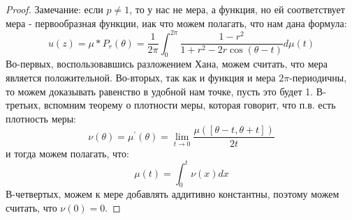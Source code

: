 \documentclass[12pt,a4paper]{article} %
\begin{document}
	\begin{proof}
		Замечание: если $p\neq1$, то у нас не мера, а функция, но ей соответствует мера - первообразная функции, иак что можем полагать, что нам дана формула:
		$$u(z)=\mu*P_r(\theta)=\frac{1}{2\pi}\int_0^{2\pi}\frac{1-r^2}{1+r^2-2r\cos(\theta-t)}d\mu(t)$$
		Во-первых, воспользовавшись разложением Хана, можем считать, что мера является положительной. Во-вторых, так как и функция и мера $2\pi$-периодичны, то можем доказывать равенство в удобной нам точке, пусть это будет 1. В-третьих, вспомним теорему о плотности меры, которая говорит, что п.в. есть плотность меры:
		$$\nu(\theta)=\mu^{'}(\theta)=\lim\limits_{t\rightarrow0}\frac{\mu([\theta-t,\theta+t])}{2t}$$
		и тогда можем полагать, что:
		$$\mu(t)=\int_0^t\nu(x)dx$$
		В-четвертых, можем к мере добавлять аддитивно константны, поэтому можем считать, что $\nu(0)=0$.
		

\end{proof}
\end{document}
